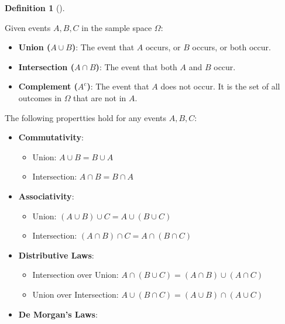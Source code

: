 \documentclass[
  letterpaper,
  DIV=11,
  numbers=noendperiod]{scrreport}
\providecommand{\tightlist}{%
  \setlength{\itemsep}{0pt}\setlength{\parskip}{0pt}}
\theoremstyle{definition}
\theoremstyle{plain}
\theoremstyle{plain}
\theoremstyle{definition}
\newtheorem{definition}{Definition}[chapter]
\theoremstyle{remark}
\begin{document}
\begin{tcolorbox}[enhanced jigsaw, opacitybacktitle=0.6, bottomtitle=1mm, opacityback=0, toprule=.15mm, colbacktitle=quarto-callout-note-color!10!white, colback=white, left=2mm, title={Basic Set Operations}, breakable, rightrule=.15mm, leftrule=.75mm, titlerule=0mm, colframe=quarto-callout-note-color-frame, arc=.35mm, coltitle=black, toptitle=1mm, bottomrule=.15mm]

\begin{definition}[]\protect\hypertarget{def-set-ops}{}\label{def-set-ops}

Given events \(A,B,C\) in the sample space \(\Omega\):

\begin{itemize}
\item
  \textbf{Union (\(A \cup B\))}: The event that \(A\) occurs, or \(B\)
  occurs, or both occur.
\item
  \textbf{Intersection (\(A \cap B\))}: The event that both \(A\) and
  \(B\) occur.
\item
  \textbf{Complement (\(A^c\))}: The event that \(A\) does not occur. It
  is the set of all outcomes in \(\Omega\) that are not in \(A\).
\end{itemize}

The following propertties hold for any events \(A, B, C\):

\begin{itemize}
\tightlist
\item
  \textbf{Commutativity}:

  \begin{itemize}
  \tightlist
  \item
    Union: \(A \cup B = B \cup A\)
  \item
    Intersection: \(A \cap B = B \cap A\)
  \end{itemize}
\item
  \textbf{Associativity}:

  \begin{itemize}
  \tightlist
  \item
    Union: \((A \cup B) \cup C = A \cup (B \cup C)\)
  \item
    Intersection: \((A \cap B) \cap C = A \cap (B \cap C)\)
  \end{itemize}
\item
  \textbf{Distributive Laws}:

  \begin{itemize}
  \tightlist
  \item
    Intersection over Union:
    \(A \cap (B \cup C) = (A \cap B) \cup (A \cap C)\)
  \item
    Union over Intersection:
    \(A \cup (B \cap C) = (A \cup B) \cap (A \cup C)\)
  \end{itemize}
\item
  \textbf{De Morgan's Laws}:


\end{itemize}
\end{definition}
\end{tcolorbox}
\end{document}
